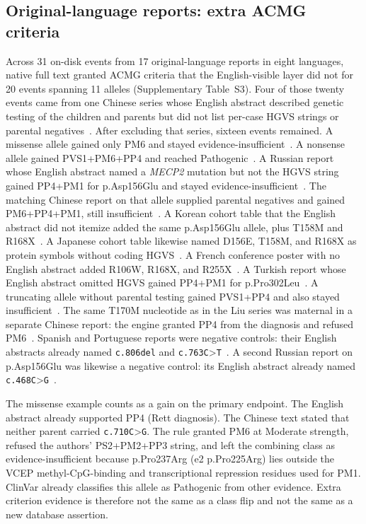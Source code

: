 \documentclass[preprint,12pt]{elsarticle}
\begin{document}
\subsection{Original-language reports: extra ACMG criteria}

Across 31 on-disk events from 17 original-language reports in eight
languages, native full text granted ACMG criteria that the English-visible
layer did not for 20 events spanning 11 alleles (Supplementary Table~S3).
Four of those twenty events came from one Chinese series whose English
abstract described genetic testing of the children and parents but did
not list per-case HGVS strings or parental negatives~\cite{liu2023}. After
excluding that series, sixteen events remained. A missense allele gained
only PM6 and stayed evidence-insufficient~\cite{zhong2024}. A nonsense
allele gained PVS1+PM6+PP4 and reached Pathogenic~\cite{han2022}. A
Russian report whose English abstract named a \textit{MECP2} mutation but
not the HGVS string gained PP4+PM1 for p.Asp156Glu and stayed
evidence-insufficient~\cite{kovalenkova2025}. The matching Chinese report
on that allele supplied parental negatives and gained PM6+PP4+PM1, still
insufficient~\cite{hu2017}. A Korean cohort table that the English
abstract did not itemize added the same p.Asp156Glu allele, plus T158M and
R168X~\cite{park2002}. A Japanese cohort table likewise named D156E,
T158M, and R168X as protein symbols without coding HGVS~\cite{kondo2002}.
A French conference poster with no English abstract
added R106W, R168X, and R255X~\cite{ghorbel2018}. A Turkish report whose
English abstract omitted HGVS gained PP4+PM1 for
p.Pro302Leu~\cite{aydin2015}. A truncating allele without parental testing
gained PVS1+PP4 and also stayed insufficient~\cite{yang2018}. The same
T170M nucleotide as in the Liu series was maternal in a separate Chinese
report: the engine granted PP4 from the diagnosis and refused
PM6~\cite{li2026}. Spanish and Portuguese reports were negative controls:
their English abstracts already named \texttt{c.806del} and
\texttt{c.763C}\textgreater\texttt{T}~\cite{cote2023,reiner2021}. A second
Russian report on p.Asp156Glu was likewise a negative control: its English
abstract already named \texttt{c.468C}\textgreater\texttt{G}~\cite{burlutskaya2021}.

The missense example counts as a gain on the primary endpoint. The English
abstract already supported PP4 (Rett diagnosis). The Chinese text stated
that neither parent carried \texttt{c.710C}\textgreater\texttt{G}. The rule granted PM6 at
Moderate strength, refused the authors' PS2+PM2+PP3 string, and left the
combining class as evidence-insufficient because p.Pro237Arg (e2
p.Pro225Arg) lies outside the VCEP methyl-CpG-binding and transcriptional
repression residues used for PM1. ClinVar already classifies this allele
as Pathogenic from other evidence. Extra criterion evidence is therefore
not the same as a class flip and not the same as a new database
assertion.
\end{document}
